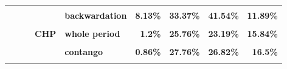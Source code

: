 \documentclass[
  authoryear,
  preprint,
  3p]{elsarticle}
\begin{document}
\begin{landscape}
\begin{longtable}[t]{>{}l>{}l>{}l>{}l>{}l>{}r>{}r>{}r>{}r}
\textbf{\cellcolor{gray!10}{}} & \textbf{\cellcolor{gray!10}{}} & \textbf{\cellcolor{gray!10}{precious}} & \textbf{\cellcolor{gray!10}{market}} & \textbf{\cellcolor{gray!10}{whole period}} & \textcolor[HTML]{4285f4}{\textbf{\cellcolor{gray!10}{8.08\%}}} & \textcolor[HTML]{4285f4}{\textbf{\cellcolor{gray!10}{32.7\%}}} & \textcolor[HTML]{4285f4}{\textbf{\cellcolor{gray!10}{35.06\%}}} & \textcolor[HTML]{4285f4}{\textbf{\cellcolor{gray!10}{18.3\%}}}\\
\textbf{} & \textbf{} & \textbf{} & \textbf{} & \textbf{backwardation} & \textcolor[HTML]{4285f4}{\textbf{8.13\%}} & \textcolor[HTML]{4285f4}{\textbf{33.37\%}} & \textcolor[HTML]{4285f4}{\textbf{41.54\%}} & \textcolor[HTML]{4285f4}{\textbf{11.89\%}}\\
\textbf{\cellcolor{gray!10}{}} & \textbf{\cellcolor{gray!10}{}} & \textbf{\cellcolor{gray!10}{}} & \textbf{\cellcolor{gray!10}{}} & \textbf{\cellcolor{gray!10}{contango}} & \textcolor[HTML]{4285f4}{\textbf{\cellcolor{gray!10}{8.12\%}}} & \textcolor[HTML]{4285f4}{\textbf{\cellcolor{gray!10}{32.35\%}}} & \textcolor[HTML]{4285f4}{\textbf{\cellcolor{gray!10}{32.07\%}}} & \textcolor[HTML]{4285f4}{\textbf{\cellcolor{gray!10}{21.88\%}}}\\
\addlinespace
\textbf{} & \textbf{} & \textbf{} & \textbf{CHP} & \textbf{whole period} & \textcolor[HTML]{4285f4}{\textbf{1.2\%}} & \textcolor[HTML]{4285f4}{\textbf{25.76\%}} & \textcolor[HTML]{4285f4}{\textbf{23.19\%}} & \textcolor[HTML]{4285f4}{\textbf{15.84\%}}\\
\textbf{\cellcolor{gray!10}{}} & \textbf{\cellcolor{gray!10}{}} & \textbf{\cellcolor{gray!10}{}} & \textbf{\cellcolor{gray!10}{}} & \textbf{\cellcolor{gray!10}{backwardation}} & \textcolor[HTML]{4285f4}{\textbf{\cellcolor{gray!10}{1.72\%}}} & \textcolor[HTML]{4285f4}{\textbf{\cellcolor{gray!10}{24.12\%}}} & \textcolor[HTML]{4285f4}{\textbf{\cellcolor{gray!10}{18.46\%}}} & \textcolor[HTML]{4285f4}{\textbf{\cellcolor{gray!10}{15.81\%}}}\\
\textbf{} & \textbf{} & \textbf{} & \textbf{} & \textbf{contango} & \textcolor[HTML]{4285f4}{\textbf{0.86\%}} & \textcolor[HTML]{4285f4}{\textbf{27.76\%}} & \textcolor[HTML]{4285f4}{\textbf{26.82\%}} & \textcolor[HTML]{4285f4}{\textbf{16.5\%}}\\
\textbf{\cellcolor{gray!10}{}} & \textbf{\cellcolor{gray!10}{}} & \textbf{\cellcolor{gray!10}{}} & \textbf{\cellcolor{gray!10}{open interest}} & \textbf{\cellcolor{gray!10}{whole period}} & \textcolor[HTML]{4285f4}{\textbf{\cellcolor{gray!10}{0.57\%}}} & \textcolor[HTML]{4285f4}{\textbf{\cellcolor{gray!10}{0.89\%}}} & \textcolor[HTML]{4285f4}{\textbf{\cellcolor{gray!10}{3.9\%}}} & \textcolor[HTML]{4285f4}{\textbf{\cellcolor{gray!10}{0.22\%}}}\\

\end{longtable}
\end{landscape}
\end{document}

